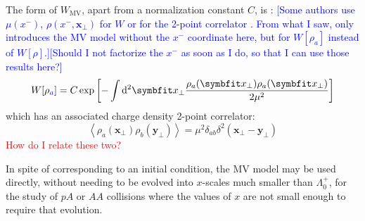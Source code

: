 The form of $W_{\text{MV}}$, apart from a normalization constant $C$, is \cite{Gelis_Habilitation}:
\textcolor{blue}{[Some authors use $\mu(x^-)$, $\rho(x^-, \mathbf{x}_\perp)$ for $W$ \cite{Albacete:2014fwa} or for the 2-point correlator \cite{Lappi_notes}. From what I saw, only \cite{Gelis_Habilitation} introduces the MV model without the $x^-$ coordinate here, but for $W[\rho_a]$ instead of $W[\rho]$.][Should I not factorize the $x^-$ as soon as I do, so that I can use those results here?]}
\begin{equation}
	W[\rho_\text{\textcolor{blue}{$a$}}] = C \exp \left[ - \int \diff^2 \mathbf{x}_\perp \frac{\rho_a(\mathbf{x_\perp})\rho_a(\mathbf{x_\perp})}{2 \mu^2} \right]
\end{equation}
which has an associated charge density 2-point correlator:
\begin{equation}
	\left< \rho_a(\mathbf{x}_\perp) \rho_b (\mathbf{y}_\perp) \right> = \mu^2 \delta_{ab} \delta^2 (\mathbf{x}_\perp - \mathbf{y}_\perp)
\end{equation}
\textcolor{red}{How do I relate these two?}

In spite of corresponding to an initial condition, the \gls{MV} model may be used directly, without needing to be evolved into $x$-scales much smaller than $\Lambda_0^+$, for the study of $pA$ or $AA$ collisions where the values of $x$ are not small enough to require that evolution. \cite{Gelis:2010nm}










